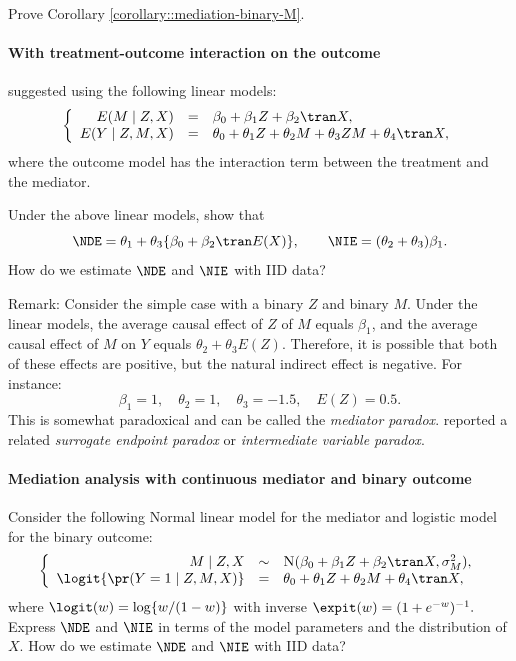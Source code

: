 Prove Corollary \ref{corollary::mediation-binary-M}. 


\paragraph{With treatment-outcome interaction on the outcome}\label{para::interaction}
\citet{vanderweele2015explanation} suggested using the following linear models:
$$
\left\{\begin{array}{rcl}
E(M \mid Z, X) &=&  \beta_0 + \beta_1 Z + \beta_2\tran X, \\
E(Y\mid Z,M,X) &=& \theta_0 + \theta_1 Z + \theta_2 M + \theta_3 ZM + \theta_4\tran X,
\end{array}\right.
$$
where the outcome model has the interaction term between the treatment and the mediator. 


Under the above linear models,  show that 
$$
\NDE = \theta_1 + \theta_3\{ \beta_0 + \beta_2\tran E(X)\}, \qquad 
\NIE = (\theta_2 + \theta_3 ) \beta_1. 
$$
How do we estimate $\NDE$ and $\NIE$ with IID data?

Remark:
Consider the simple case with a binary $Z$ and binary $M$.
Under the linear models, the average causal effect of $Z$ of $M$ equals $\beta_1$, and the average causal effect of $M$ on $Y$ equals $\theta_2 + \theta_3 E(Z)$. Therefore, it is possible that both of these effects are positive, but the natural indirect effect is negative. For instance:
$$
\beta_1 = 1,\quad \theta_2 = 1, \quad  \theta_3= -1.5, \quad E(Z) = 0.5.
$$ 
This is somewhat paradoxical and can be called the {\it mediator paradox}. \citet{chen2007criteria} reported a related {\it surrogate endpoint paradox} or {\it intermediate variable paradox}.



\paragraph{Mediation analysis with continuous mediator and binary outcome}\label{para::continM-binaryY}


Consider the following Normal linear model for the mediator and logistic model for the binary outcome:
$$
\left\{\begin{array}{rcl}
M \mid Z, X &\sim &  \textsc{N}(\beta_0 + \beta_1 Z + \beta_2\tran X, \sigma_M^2), \\
\logit \{ \pr(Y = 1 \mid Z,M,X ) \} &=& \theta_0 + \theta_1 Z + \theta_2 M +   \theta_4\tran X,
\end{array}\right.
$$
where $\logit (w)  = \log\{ w/(1-w) \} $ with inverse $\expit(w) = (1 + e^{-w})^{-1}.$
Express $\NDE$ and $\NIE$ in terms of the model parameters and the distribution of $X$. How do we estimate $\NDE$ and $\NIE$ with IID data?





